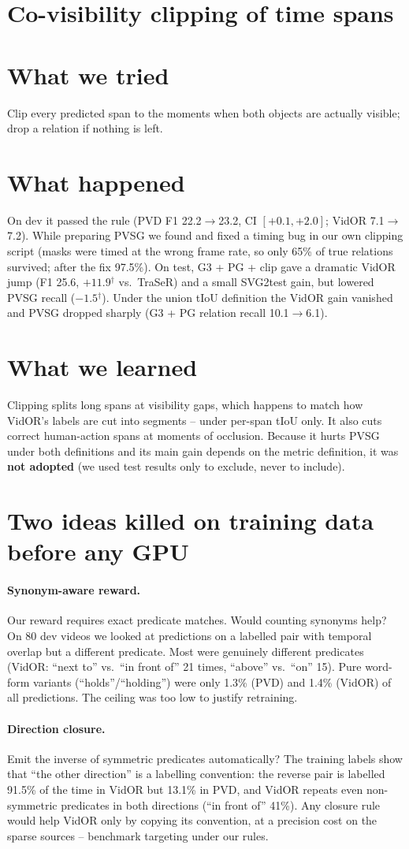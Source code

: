 \documentclass[11pt,openany]{book}
\newcommand{\sig}{\ensuremath{^\dagger}}
\newcommand{\tsec}{\section*{What we tried}}
\newcommand{\hsec}{\section*{What happened}}
\newcommand{\lsec}{\section*{What we learned}}
\begin{document}
\section{Co-visibility clipping of time spans}
\tsec
Clip every predicted span to the moments when both objects are actually visible; drop a relation if nothing is left.

\hsec
On dev it passed the rule (PVD F1 22.2$\to$23.2, CI $[+0.1,+2.0]$; VidOR 7.1$\to$7.2). While preparing PVSG we found and fixed a timing
bug in our own clipping script (masks were timed at the wrong frame rate, so only 65\% of true relations survived; after the fix
97.5\%). On test, G3 + PG + clip gave a dramatic VidOR jump (F1 25.6, $+11.9$\sig{} vs.\ TraSeR) and a small SVG2test gain, but lowered
PVSG recall ($-1.5$\sig). Under the union tIoU definition the VidOR gain vanished and PVSG dropped sharply (G3 + PG relation recall
10.1$\to$6.1).

\lsec
Clipping splits long spans at visibility gaps, which happens to match how VidOR's labels are cut into segments -- under per-span
tIoU only. It also cuts correct human-action spans at moments of occlusion. Because it hurts PVSG under both definitions and its
main gain depends on the metric definition, it was \textbf{not adopted} (we used test results only to exclude, never to include).

\section{Two ideas killed on training data before any GPU}
\paragraph{Synonym-aware reward.} Our reward requires exact predicate matches. Would counting synonyms help? On 80 dev videos we
looked at predictions on a labelled pair with temporal overlap but a different predicate. Most were genuinely different predicates
(VidOR: ``next to'' vs.\ ``in front of'' 21 times, ``above'' vs.\ ``on'' 15). Pure word-form variants (``holds''/``holding'') were only
1.3\% (PVD) and 1.4\% (VidOR) of all predictions. The ceiling was too low to justify retraining.

\paragraph{Direction closure.} Emit the inverse of symmetric predicates automatically? The training labels show that ``the other
direction'' is a labelling convention: the reverse pair is labelled 91.5\% of the time in VidOR but 13.1\% in PVD, and VidOR repeats
even non-symmetric predicates in both directions (``in front of'' 41\%). Any closure rule would help VidOR only by copying its
convention, at a precision cost on the sparse sources -- benchmark targeting under our rules.
\end{document}
